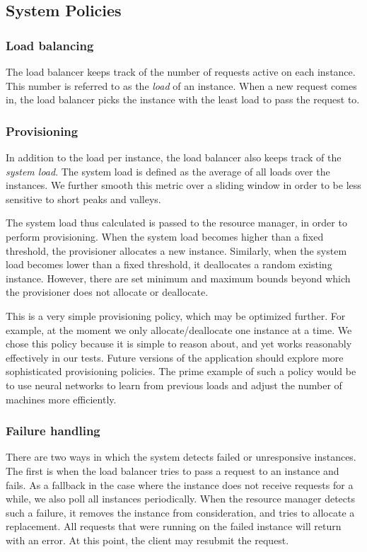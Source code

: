 \documentclass[conference]{IEEEtran}
\begin{document}
\subsection{System Policies}

\subsubsection{Load balancing}
The load balancer keeps track of the number of requests active on each instance. This number is referred to as the \emph{load} of an instance. When a new request comes in, the load balancer picks the instance with the least load to pass the request to.

\subsubsection{Provisioning}
In addition to the load per instance, the load balancer also keeps track of the \emph{system load}. The system load is defined as the average of all loads over the instances. We further smooth this metric over a sliding window in order to be less sensitive to short peaks and valleys.

The system load thus calculated is passed to the resource manager, in order to perform provisioning. When the system load becomes higher than a fixed threshold, the provisioner allocates a new instance. Similarly, when the system load becomes lower than a fixed threshold, it deallocates a random existing instance. However, there are set minimum and maximum bounds beyond which the provisioner does not allocate or deallocate.

This is a very simple provisioning policy, which may be optimized further. For example, at the moment we only allocate/deallocate one instance at a time. We chose this policy because it is simple to reason about, and yet works reasonably effectively in our tests. Future versions of the application should explore more sophisticated provisioning policies. The prime example of such a policy would be to use neural networks to learn from previous loads and adjust the number of machines more efficiently.

\subsubsection{Failure handling}
There are two ways in which the system detects failed or unresponsive instances. The first is when the load balancer tries to pass a request to an instance and fails. As a fallback in the case where the instance does not receive requests for a while, we also poll all instances periodically. When the resource manager detects such a failure, it removes the instance from consideration, and tries to allocate a replacement. All requests that were running on the failed instance will return with an error. At this point, the client may resubmit the request.
\end{document}
